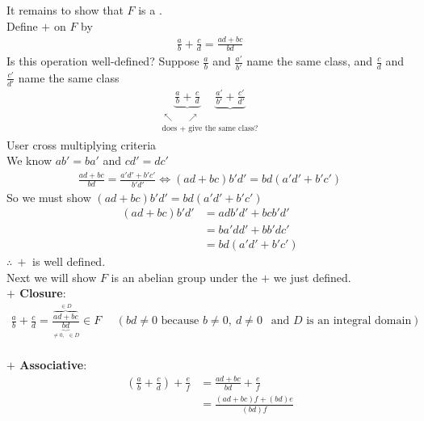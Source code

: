 \begin{theorem}
\begin{tcolorbox}
    \end{tcolorbox}
    \noindent It remains to show that $F$ is a . \\
    Define $+$ on $F$ by
    \begin{align}
        \frac{a}{b}+\frac{c}{d} = \frac{ad+bc}{bd} \nonumber
    \end{align}
    Is this operation well-defined? Suppose $\frac{a}{b}$ and $\frac{a'}{b'}$ name the same class,
    and $\frac{c}{d}$ and $\frac{c'}{d'}$ name the same class
    \begin{align}
        \underset{\substack{\nwarrow \ \ \ \ \ \ \ \nearrow \\ \text{does }+\text{ give the same class?}}}{\underbrace{\frac{a}{b}+\frac{c}{d}} \ \ \ \ \ \ \underbrace{\frac{a'}{b'}+\frac{c'}{d'}}} \nonumber
    \end{align}
    User cross multiplying criteria \steezybreak \\
    We know $ab'=ba'$ and $cd'=dc'$
    \begin{align}
        \frac{ad+bc}{bd} = \frac{a'd'+b'c'}{b'd'} \iff (ad+bc)b'd' = bd(a'd'+b'c') \nonumber
    \end{align}
    So we must show $(ad+bc)b'd' = bd(a'd'+b'c')$
    \begin{align}
        (ad+bc)b'd' &= adb'd'+bcb'd' \nonumber \\
        &= ba'dd' + bb'dc' \nonumber \\
        &= bd(a'd'+b'c')\nonumber
    \end{align}
    $\therefore \ +$ is well defined. \steezybreak \\
    Next we will show $F$ is an abelian group under the $+$ we just defined. \\
    \noindent \textbf{$+$ Closure}: \\
    \begin{align}
        \frac{a}{b}+\frac{c}{d} = \frac{\overbrace{ad+bc}^{\in D}}{\underbrace{bd}_{\neq 0, \ \ \in D}} \in F \ \ \ \ \ \ (bd\neq 0\text{ because }b\neq 0, \ d\neq 0 \ \ \text{ and }D \text{ is an integral domain}) \nonumber
    \end{align}\\
    \noindent \textbf{$+$ Associative}: \\
    \begin{align}
        \left(\frac{a}{b}+\frac{c}{d}\right)+\frac{e}{f} &= \frac{ad+bc}{bd} + \frac{e}{f} \nonumber \\
        &= \frac{(ad+bc)f+(bd)e}{(bd)f} \nonumber \\

\end{align}
\end{theorem}
